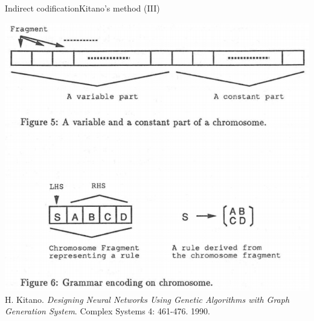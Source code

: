 \documentclass[10pt,compress]{beamer} %
\begin{document}
\begin{frame}[plain]{Indirect codification}{Kitano's method (III)}
	\begin{center}
	\includegraphics[width=0.7\linewidth]{figs/kitanoCodification.png}\\
    \tiny{H. Kitano. \textit{Designing Neural Networks Using Genetic Algorithms with Graph Generation System}. Complex Systems 4: 461-476. 1990.}
	\end{center}
\end{frame}


			
\end{document}
